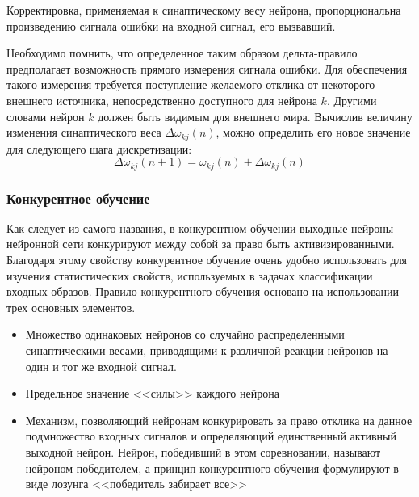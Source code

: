 Корректировка, применяемая к синаптическому весу нейрона, пропорциональна произведению сигнала ошибки на входной сигнал, его вызвавший.

Необходимо помнить, что  определенное таким образом дельта-правило предполагает возможность прямого измерения сигнала ошибки.
Для обеспечения такого измерения требуется поступление желаемого отклика от некоторого внешнего источника, непосредственно доступного для нейрона $k$.
Другими словами нейрон $k$ должен быть видимым для внешнего мира.
Вычислив величину изменения синаптического веса $\Delta\omega_{kj}(n)$, можно определить его новое значение для следующего шага дискретизации:
\begin{equation}
\Delta\omega_{kj}(n+1) = \omega_{kj}(n) +\Delta\omega_{kj}(n)
\end{equation}

\subsubsection{Конкурентное обучение}

Как следует из самого названия, в конкурентном обучении выходные нейроны нейронной сети конкурируют между собой за право быть активизированными.
Благодаря этому свойству конкурентное обучение очень удобно использовать для изучения статистических свойств, используемых в задачах классификации входных образов. 
Правило конкурентного обучения основано на использовании трех основных элементов.
\begin{itemize}
\item Множество одинаковых нейронов со случайно распределенными синаптическими весами, приводящими к различной реакции нейронов на один и тот же входной сигнал.
\item Предельное значение <<силы>> каждого нейрона
\item Механизм, позволяющий нейронам конкурировать за право отклика на данное подмножество входных сигналов  и определяющий единственный активный выходной нейрон.
Нейрон, победивший в этом соревновании, называют нейроном-победителем, а принцип конкурентного обучения формулируют в виде лозунга <<победитель забирает все>> 
\end{itemize}
